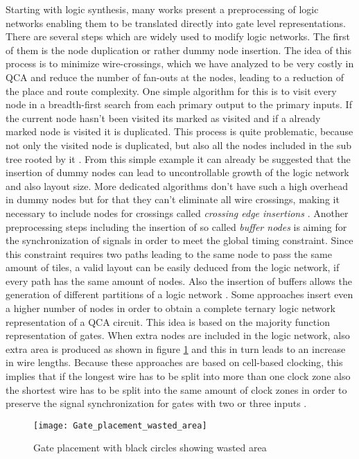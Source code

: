 Starting with logic synthesis, many works present a preprocessing of logic networks enabling them to be translated directly into gate level representations. There are several steps which are widely used to modify logic networks. The first of them is the node duplication or rather dummy node insertion. The idea of this process is to minimize wire-crossings, which we have analyzed to be very costly in QCA and reduce the number of fan-outs at the nodes, leading to a reduction of the place and route complexity. One simple algorithm for this is to visit every node in a breadth-first search from each primary output to the primary inputs. If the current node hasn't been visited its marked as visited and if a already marked node is visited it is duplicated. This process is quite problematic, because not only the visited node is duplicated, but also all the nodes included in the sub tree rooted by it \cite{QCA-LG}. From this simple example it can already be suggested that the insertion of dummy nodes can lead to uncontrollable growth of the logic network and also layout size. More dedicated algorithms don't have such a high overhead in dummy nodes but for that they can't eliminate all wire crossings, making it necessary to include nodes for crossings called \textit{crossing edge insertions} \cite{node_duplication}. Another preprocessing steps including the insertion of so called \textit{buffer nodes} is aiming for the synchronization of signals in order to meet the global timing constraint. Since this constraint requires two paths leading to the same node to pass the same amount of tiles, a valid layout can be easily deduced from the logic network, if every path has the same amount of nodes. Also the insertion of buffers allows the generation of different partitions of a logic network \cite{dummy_and_buffer_nodes}. Some approaches insert even a higher number of nodes in order to obtain a complete ternary logic network representation of a QCA circuit. This idea is based on the majority function representation of gates. When extra nodes are included in the logic network, also extra area is produced as shown in figure \ref{fig:Gate_placement_wasted_area} and this in turn leads to an increase in wire lengths. Because these approaches are based on cell-based clocking, this implies that if the longest wire has to be split into more than one clock zone also the shortest wire has to be split into the same amount of clock zones in order to preserve the signal synchronization for gates with two or three inputs \cite{QCA-LG}.

\begin{figure}
	\centering
	\texttt{[image: Gate\_placement\_wasted\_area]}
	\caption{Gate placement with black circles showing wasted area \cite{QCA-LG}}\label{fig:Gate_placement_wasted_area}
\end{figure}

